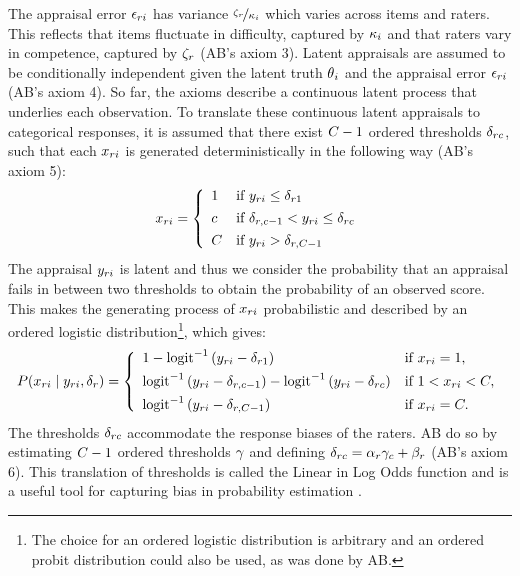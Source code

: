 \documentclass[a4paper]{article}
\newcommand{\AB}{AB}
\begin{document}
The appraisal error $\epsilon_{ri}$ has variance $\nicefrac{\zeta_r}{\kappa_i}$ which varies across items and raters. This reflects that items fluctuate in difficulty, captured by $\kappa_i$ and that raters vary in competence, captured by $\zeta_r$ (\AB{}'s axiom 3). Latent appraisals are assumed to be conditionally independent given the latent truth $\theta{}_i$ and the appraisal error $\epsilon_{ri}$ (\AB{}'s axiom 4). So far, the axioms describe a continuous latent process that underlies each observation. To translate these continuous latent appraisals to categorical responses, it is assumed that there exist $\Tncat - 1$ ordered thresholds $\delta_{rc}$, such that each $x_{ri}$ is generated deterministically in the following way (\AB{}'s axiom 5):
\begin{align*}
	x_{\Irater\Iitem} = 
	\left\{\begin{array}{ll} 
	1		& \text{if }  \Appraisal_{\Irater\Iitem} \leq \Threshold_{\Irater 1} \\[4pt]
	\Incat	& \text{if }  \Threshold_{\Irater, \Incat-1} <  \Appraisal_{\Irater\Iitem} \leq \Threshold_{\Irater\Incat} \\[4pt]
	\Tncat	& \text{if }  \Appraisal_{\Irater\Iitem} > \Threshold_{\Irater, \Tncat-1}
	\end{array} \right.
\end{align*}
The appraisal $y_{ri}$ is latent and thus we consider the probability that an appraisal fails in between two thresholds to obtain the probability of an observed score. This makes the generating process of $x_{ri}$ probabilistic and described by an ordered logistic distribution\footnote{The choice for an ordered logistic distribution is arbitrary and an ordered probit distribution could also be used, as was done by \AB{}.}, which gives:
\begin{align*}
P(x_{\Irater\Iitem}\mid  \Appraisal_{\Irater\Iitem},\delta_{\Irater}) = 
\left\{\begin{array}{ll} 
1 - \ilogit{\Appraisal_{\Irater\Iitem} - \Threshold_{\Irater 1}}         & \text{if } x_{\Irater\Iitem} = 1, \\[4pt]
	\ilogit{\Appraisal_{\Irater\Iitem} - \Threshold_{\Irater,\Incat-1}} - 
	\ilogit{\Appraisal_{\Irater\Iitem} - \Threshold_{\Irater\Incat}}         & \text{if } 1 < x_{\Irater\Iitem} < \Tncat,\\[4pt]
	\ilogit{\Appraisal_{\Irater\Iitem} - \Threshold_{\Irater,\Tncat-1}}       & \text{if } x_{\Irater\Iitem} = \Tncat. 
\end{array} \right.
\end{align*}
The thresholds $\delta_{rc}$ accommodate the response biases of the raters. \AB{} do so by estimating $\Tncat-1$ ordered thresholds $\gamma$ and defining $\delta_{rc} = \alpha_r \gamma_c + \beta_r$ (\AB{}'s axiom 6). This translation of thresholds is called the Linear in Log Odds function and is a useful tool for capturing bias in probability estimation \cite{Fox1995, Gonzalez1999, Anders2015cultural}.
\end{document}
